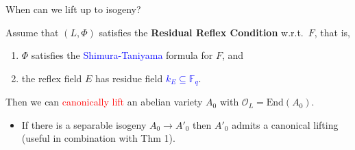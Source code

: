 \documentclass[usenames,dvipsnames,handout]{beamer}
\def\F{\mathbb{F}}
\newcommand{\red}[1]{\textcolor{red}{#1}}
\newcommand{\blue}[1]{\textcolor{blue}{#1}}
\begin{document}
\begin{frame}{ When can we lift up to isogeny?  }
	\begin{theorem}
    Assume that $(L,\Phi)$ satisfies the {\bf Residual Reflex Condition} w.r.t.~$F$, that is,\\
    \begin{enumerate}
    \item $\Phi$ satisfies the \blue{Shimura-Taniyama} formula for $F$, and
    \item the reflex field $E$ has residue field \blue{$k_E\subseteq \F_q$}.
    \end{enumerate}  
\pause 
    Then we can \red{canonically lift} an abelian variety $A_0$ with $\mathcal{O}_L = \mathrm{End}(A_0)$.
	\end{theorem}
	\begin{itemize}
\pause
    \item If there is a separable isogeny $A_0\to A'_0$ then $A'_0$ admits a canonical lifting (useful in combination with Thm 1).
	\end{itemize}
\end{frame}
\end{document}
